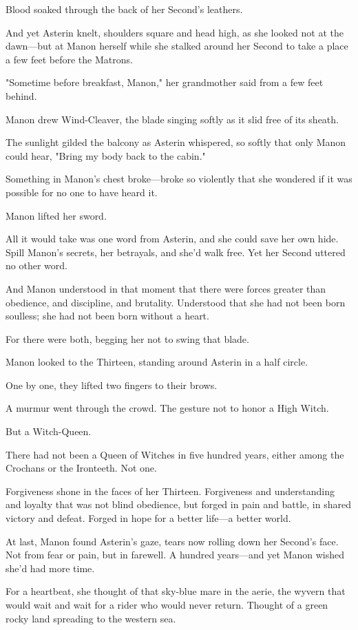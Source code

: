Blood soaked through the back of her Second's leathers.

And yet Asterin knelt, shoulders square and head high, as she looked not at the dawn---but at Manon herself while she stalked around her Second to take a place a few feet before the Matrons.

"Sometime before breakfast, Manon," her grandmother said from a few feet behind.

Manon drew Wind-Cleaver, the blade singing softly as it slid free of its sheath.

The sunlight gilded the balcony as Asterin whispered, so softly that only Manon could hear, "Bring my body back to the cabin."

Something in Manon's chest broke---broke so violently that she wondered if it was possible for no one to have heard it.

Manon lifted her sword.

All it would take was one word from Asterin, and she could save her own hide.
Spill Manon's secrets, her betrayals, and she'd walk free.
Yet her Second uttered no other word.

And Manon understood in that moment that there were forces greater than obedience, and discipline, and brutality.
Understood that she had not been born soulless; she had not been born without a heart.

For there were both, begging her not to swing that blade.

Manon looked to the Thirteen, standing around Asterin in a half circle.

One by one, they lifted two fingers to their brows.

A murmur went through the crowd.
The gesture not to honor a High Witch.

But a Witch-Queen.

There had not been a Queen of Witches in five hundred years, either among the Crochans or the Ironteeth.
Not one.

Forgiveness shone in the faces of her Thirteen.
Forgiveness and understanding and loyalty that was not blind obedience, but forged in pain and battle, in shared victory and defeat.
Forged in hope for a better life---a better world.

At last, Manon found Asterin's gaze, tears now rolling down her Second's face.
Not from fear or pain, but in farewell.
A hundred years---and yet Manon wished she'd had more time.

For a heartbeat, she thought of that sky-blue mare in the aerie, the wyvern that would wait and wait for a rider who would never return.
Thought of a green rocky land spreading to the western sea.

